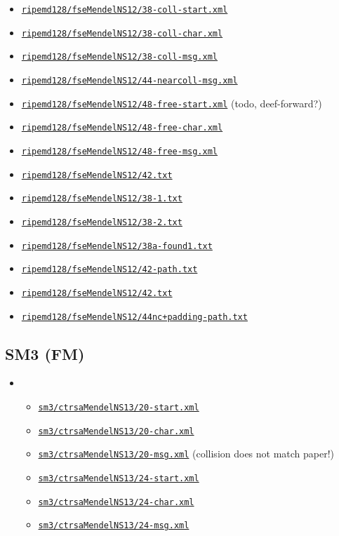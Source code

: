 \documentclass[11pt, a4paper]{article}
\newcommand{\hashlink}[2][black]{\href{https://extgit.iaik.tugraz.at/krypto/nldtool/blob/master/hash/#2}{\color{#1}\nolinkurl{#2}}}
\begin{document}
\begin{itemize}
    \begin{itemize}
      \item \hashlink[todo]{ripemd128/fseMendelNS12/38-coll-start.xml}
      \item \hashlink[todo]{ripemd128/fseMendelNS12/38-coll-char.xml}
      \item \hashlink[todo]{ripemd128/fseMendelNS12/38-coll-msg.xml}
      \item \hashlink[todo]{ripemd128/fseMendelNS12/44-nearcoll-msg.xml}
      \item \hashlink[todo]{ripemd128/fseMendelNS12/48-free-start.xml} (todo, deef-forward?)
      \item \hashlink[todo]{ripemd128/fseMendelNS12/48-free-char.xml}
      \item \hashlink[todo]{ripemd128/fseMendelNS12/48-free-msg.xml}
      \item \hashlink[todo]{ripemd128/fseMendelNS12/42.txt}
      \item \hashlink[todo]{ripemd128/fseMendelNS12/38-1.txt}
      \item \hashlink[todo]{ripemd128/fseMendelNS12/38-2.txt}
      \item \hashlink[todo]{ripemd128/fseMendelNS12/38a-found1.txt}
      \item \hashlink[todo]{ripemd128/fseMendelNS12/42-path.txt}
      \item \hashlink[todo]{ripemd128/fseMendelNS12/42.txt}
      \item \hashlink[todo]{ripemd128/fseMendelNS12/44nc+padding-path.txt}
     \end{itemize}

\subsection{SM3 (FM)}

\begin{itemize}
  \item {}
    \begin{itemize}
      \item \hashlink[todo]{sm3/ctrsaMendelNS13/20-start.xml} 
      \item \hashlink[todo]{sm3/ctrsaMendelNS13/20-char.xml}
      \item \hashlink[todo]{sm3/ctrsaMendelNS13/20-msg.xml} (collision does not match paper!)
      \item \hashlink[todo]{sm3/ctrsaMendelNS13/24-start.xml}
      \item \hashlink[todo]{sm3/ctrsaMendelNS13/24-char.xml} 
      \item \hashlink[done]{sm3/ctrsaMendelNS13/24-msg.xml} 
    \end{itemize}
\end{itemize}


\end{itemize}
\end{document}
